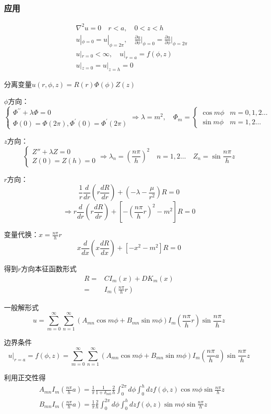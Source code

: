 \subsubsection{应用}
\begin{ex}[圆柱体Laplace方程]
$$\begin{aligned}
    &\nabla^{2}u=0\quad r<a,\quad0<z<h\\
    &u|_{\phi=0}=u|_{\phi=2\pi},\quad\frac{\partial u}{\partial\phi}\bigg|_{\phi=0}=\frac{\partial u}{\partial\phi}\bigg|_{\phi=2\pi}\\
    &u|_{r=0}<\infty,\quad u|_{r=a}=f(\phi,z)\\
    &u|_{z=0}=u|_{z=h}=0
\end{aligned}$$

\noindent 分离变量$u(r,\phi,z)=R(r)\Phi(\phi)Z(z)$

\noindent $\phi$方向：
$$\begin{cases}
    \Phi^{\prime\prime}+\lambda\Phi=0\\
    \Phi(0)=\Phi(2\pi),\Phi^{\prime}(0)=\Phi^{\prime}(2\pi)
\end{cases}\Rightarrow \lambda=m^2,\quad
\Phi_{m}=
\begin{cases}
    \cos m\phi&m=0,1,2\ldots\\
    \sin m\phi&m=1,2\ldots
\end{cases}$$

\noindent $z$方向：
$$\begin{cases}
    Z''+\lambda Z=0\\
    Z(0)=Z(h)=0
\end{cases}
\Rightarrow \lambda_{n}=(\frac{n\pi}{h})^{2}\quad n=1,2\dots\quad Z_{n}=\sin\frac{n\pi}{h}z
$$

\noindent $r$方向：
$$\frac{1}{r}\frac{d}{dr}(r\frac{dR}{dr})+(-\lambda-\frac{\mu}{r^{2}})R=0$$
$$\Rightarrow r\frac{d}{dr}(r\frac{dR}{dr})+[-(\frac{n\pi}{h}r)^{2}-m^{2}]R=0$$

变量代换：$x=\frac{n\pi}{h}r$
$$x\frac{d}{dx}(x\frac{dR}{dx})+[-x^{2}-m^{2}]R=0$$

得到$r$方向本征函数形式
$$\begin{aligned}R=&CI_{m}(x)+DK_{m}(x)\\=&I_{m}(\frac{n\pi}{h}r)\end{aligned}$$

\noindent 一般解形式
$$u=\sum_{m=0}^{\infty}\sum_{n=1}^{\infty}(A_{mn}\cos m\phi+B_{mn}\sin m\phi)I_{m}(\frac{n\pi}{h}r)\sin\frac{n\pi}{h}z$$

边界条件
$$u|_{r=a}=f(\phi,z)=\sum_{m=0}^{\infty}\sum_{n=1}^{\infty}(A_{mn}\cos m\phi+B_{mn}\sin m\phi)I_{m}(\frac{n\pi}{h}a)\sin\frac{n\pi}{h}z$$

利用正交性得
$$\begin{aligned}
    &A_{mn}I_{m}(\frac{n\pi}{h}a)=\frac{1}{\pi}\frac{1}{1+\delta_{m0}}\frac{2}{h}\int_{0}^{2\pi}d\phi\int_{0}^{h}dzf(\phi,z)\cos m\phi\sin\frac{n\pi}{h}z\\
    &B_{mn}I_{m}(\frac{n\pi}{h}a)=\frac{1}{\pi}\frac{2}{h}\int_{0}^{2\pi}d\phi\int_{0}^{h}dzf(\phi,z)\sin m\phi\sin\frac{n\pi}{h}z
\end{aligned}$$
\end{ex}

